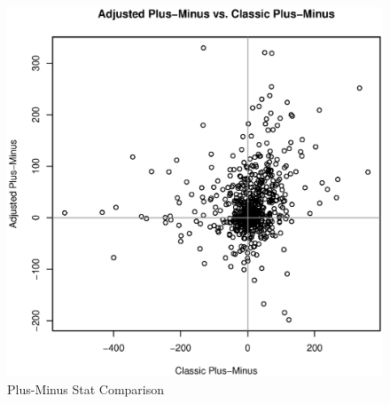 \documentclass[11pt, fleqn]{article}
\begin{document}
\begin{figure}[!htb]
  \centering
  \includegraphics[scale=.5]{pm_compare.eps}
  \caption{Plus-Minus Stat Comparison}
  \label{fig:pm_compare}
\end{figure}
\end{document}
